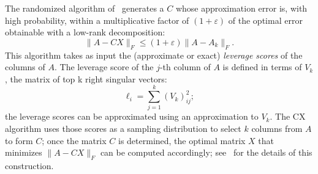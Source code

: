 
The randomized algorithm of~\cite{DMM08} generates a $C$ whose approximation error is, with high probability, within a multiplicative factor of $(1+\varepsilon)$ of the optimal error obtainable with a low-rank decomposition:
\[
\|A - CX\|_F \leq (1+ \varepsilon) \|A - A_k\|_F.
\]
This algorithm takes as input the (approximate or exact) \emph{leverage scores} of the columns of $A.$ The leverage score of the $j$-th column of $A$ is defined in terms of $V_k$, the matrix of top k right singular vectors:
  \begin{equation}
    \label{eqn:lev}
     \ell_i = \sum_{j=1}^k (V_k) _{ij}^2;
   \end{equation}
the leverage scores can be approximated using an approximation to $V_k.$ The CX algorithm uses those scores as a sampling distribution to select $k$ columns from $A$ to form $C$; once the matrix $C$ is determined, the optimal matrix $X$ that minimizes $\|A-CX\|_F$ can be computed accordingly; see~\cite{DMM08} for the details of this construction.


